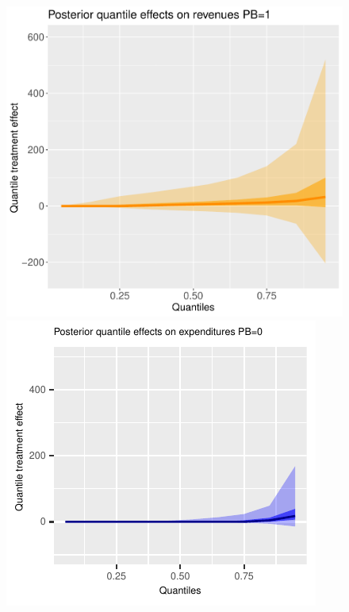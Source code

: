 \documentclass[english,12pt]{article}\usepackage{lmodern}
\numberwithin{equation}{section}
\begin{document}
\begin{figure}[h!]
    \includegraphics[scale=0.45]{posterior_parent_quantile_TEs_revenues_pb_1_lognormal.pdf}\\
    \includegraphics[scale=0.45]{posterior_parent_quantile_TEs_expenditures_pb_0_lognormal.pdf}

\end{figure}
\end{document}
